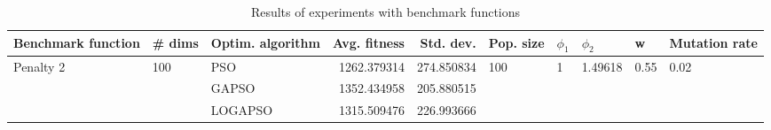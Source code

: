\begin{table}
\centering
\caption{Results of experiments with benchmark functions}
\begin{tabular}{lllrrlllll}
\toprule
        Benchmark function &              \# dims & Optim. algorithm &  Avg. fitness &  Std. dev. &            Pop. size &         $\phi_{1}$ &               $\phi_{2}$ &                     w &         Mutation rate \\
\midrule
\multirow{3}{*}{Penalty 2} & \multirow{3}{*}{100} &              PSO &   1262.379314 & 274.850834 & \multirow{3}{*}{100} & \multirow{3}{*}{1} & \multirow{3}{*}{1.49618} & \multirow{3}{*}{0.55} & \multirow{3}{*}{0.02} \\
                           &                      &            GAPSO &   1352.434958 & 205.880515 &                      &                    &                          &                       &                       \\
                           &                      &          LOGAPSO &   1315.509476 & 226.993666 &                      &                    &                          &                       &                       \\
\bottomrule
\end{tabular}
\end{table}
